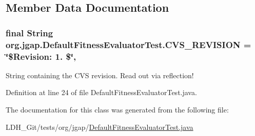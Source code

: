 \subsection{Member Data Documentation}
\hypertarget{classorg_1_1jgap_1_1_default_fitness_evaluator_test_affb1fb6eeee86dbc5d9f4ac21fed9b85}{
\subsubsection[{C\-V\-S\-\_\-\-R\-E\-V\-I\-S\-I\-O\-N}]{\setlength{\rightskip}{0pt plus 5cm}final String org.\-jgap.\-Default\-Fitness\-Evaluator\-Test.\-C\-V\-S\-\_\-\-R\-E\-V\-I\-S\-I\-O\-N = \char`\"{}\$Revision\-: 1. \$\char`\"{}\hspace{0.3cm}{\ttfamily [static]}, {\ttfamily [private]}}}\label{classorg_1_1jgap_1_1_default_fitness_evaluator_test_affb1fb6eeee86dbc5d9f4ac21fed9b85}
String containing the C\-V\-S revision. Read out via reflection! 

Definition at line 24 of file Default\-Fitness\-Evaluator\-Test.\-java.



The documentation for this class was generated from the following file\-:\begin{DoxyCompactItemize}
\item 
L\-D\-H\-\_\-\-Git/tests/org/jgap/\hyperlink{_default_fitness_evaluator_test_8java}{Default\-Fitness\-Evaluator\-Test.\-java}\end{DoxyCompactItemize}
